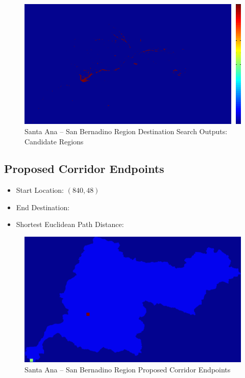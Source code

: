         \begin{figure}[!h]
            \begin{center}
            \includegraphics[width=5.5in]{figures/SanBernadino_Search_Output.png}   
            \caption{Santa Ana -- San Bernadino Region Destination Search Outputs: Candidate Regions}
            \label{fig:SASBdsoutputs_cand}
            \end{center}
        \end{figure}

    \subsection{Proposed Corridor Endpoints}
    
    \begin{itemize}
      \setlength{\itemsep}{0cm}
      \setlength{\parskip}{0cm}
        \item Start Location: $(840,48)$
        \item End Destination: 
        \item Shortest Euclidean Path Distance: 
    \end{itemize}
    
        \begin{figure}[!h]
            \begin{center}
            \includegraphics[width=5.5in]{figures/SanBernadino_Endpoints.png}   
            \caption{Santa Ana -- San Bernadino Region Proposed Corridor Endpoints}
            \label{fig:SASBendpoints}
            \end{center}
        \end{figure}
    
